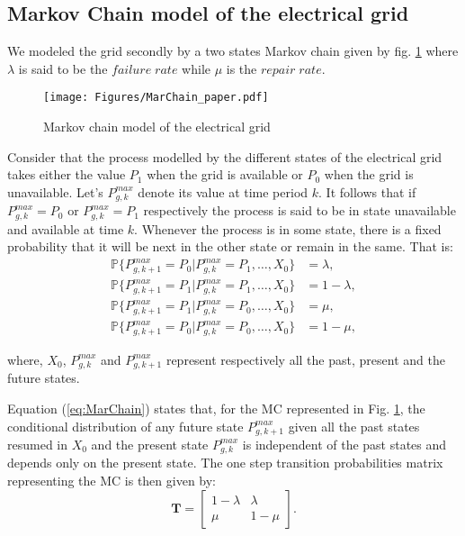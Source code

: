 \documentclass[conference]{IEEEtran}
\begin{document}
\subsection{Markov Chain model of the electrical grid }
 We modeled the grid secondly by a two states Markov chain given by fig. \ref{fig:MarChain} where $\lambda$ is said to be the $failure \; rate$ while $\mu$ is the $repair\; rate$.
 \begin{figure}[!ht]
        \begin{center}
                \texttt{[image: Figures/MarChain\_paper.pdf]}
        \end{center}
        \caption{Markov chain model of the electrical grid}
        \label{fig:MarChain}
\end{figure}
Consider that the process modelled by the different states of the electrical grid takes either the value $P_1$ when the grid is available or $P_0$ when the grid is unavailable. Let's $P^{max}_{g,k}$ denote its value at time period $k$. It follows that if $P_{g,k}^{max} = P_0$ or $P_{g,k}^{max} = P_1$ respectively the process is said to be in state unavailable and available at time $k$. Whenever the process is in some state, there is a fixed probability that it will be next in the other state or remain in the same. That is: 
\begin{subequations}\label{eq:MarChain}
\begin{align}
    \mathbb{P} \lbrace P^{max}_{g,k+1} =  P_0 | P^{max}_{g,k} = P_1, \ldots, X_0 \rbrace  &= \lambda, \\
    \mathbb{P} \lbrace P^{max}_{g,k+1} =  P_1 | P^{max}_{g,k} = P_1, \ldots, X_0 \rbrace  &= 1-\lambda, \\
    \mathbb{P} \lbrace P^{max}_{g,k+1} =  P_1 | P^{max}_{g,k} = P_0, \ldots, X_0 \rbrace  &= \mu, \\
    \mathbb{P} \lbrace P^{max}_{g,k+1} =  P_0 | P^{max}_{g,k } = P_0, \ldots, X_0 \rbrace  &= 1-\mu,
\end{align}
\end{subequations}

where, $X_0$, $P^{max}_{g,k}$ and $P^{max}_{g,k+1}$ represent respectively all the past,  present and the future states. 

Equation (\ref{eq:MarChain}) states that, for the MC represented in Fig. \ref{fig:MarChain}, the conditional distribution of any future state $P^{max}_{g,k+1}$ given all the past states resumed in $X_0$ and the present state $P^{max}_{g,k}$ is independent of the past states and
depends only on the present state. The one step transition probabilities matrix representing the MC is then given by: 
\begin{equation}\label{eq:MarChain_TransMat}
\mathbf{T} = 
  \begin{bmatrix}
 1-\lambda  & \lambda \\ 
 \mu & 1- \mu
\end{bmatrix} . 
\end{equation}
\end{document}
